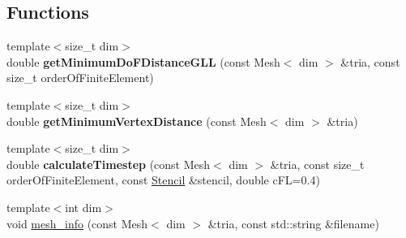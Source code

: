 \subsection*{Functions}
\begin{DoxyCompactItemize}
\item 
\hypertarget{namespacenatrium_1_1CFDSolverUtilities_a3389fcb9cec2ab96fc0623040ac03c58}{
{\footnotesize template$<$size\_\-t dim$>$ }\\double {\bfseries getMinimumDoFDistanceGLL} (const Mesh$<$ dim $>$ \&tria, const size\_\-t orderOfFiniteElement)}
\label{namespacenatrium_1_1CFDSolverUtilities_a3389fcb9cec2ab96fc0623040ac03c58}

\item 
\hypertarget{namespacenatrium_1_1CFDSolverUtilities_a8f085f7c799843b1e70330b35ef6747d}{
{\footnotesize template$<$size\_\-t dim$>$ }\\double {\bfseries getMinimumVertexDistance} (const Mesh$<$ dim $>$ \&tria)}
\label{namespacenatrium_1_1CFDSolverUtilities_a8f085f7c799843b1e70330b35ef6747d}

\item 
\hypertarget{namespacenatrium_1_1CFDSolverUtilities_a8b3dcb633547349d6e217692dccfbc58}{
{\footnotesize template$<$size\_\-t dim$>$ }\\double {\bfseries calculateTimestep} (const Mesh$<$ dim $>$ \&tria, const size\_\-t orderOfFiniteElement, const \hyperlink{classnatrium_1_1Stencil}{Stencil} \&stencil, double cFL=0.4)}
\label{namespacenatrium_1_1CFDSolverUtilities_a8b3dcb633547349d6e217692dccfbc58}

\item 
\hypertarget{namespacenatrium_1_1CFDSolverUtilities_adbcdda8cf5f7f3f0c835950a23e4c888}{
{\footnotesize template$<$int dim$>$ }\\void \hyperlink{namespacenatrium_1_1CFDSolverUtilities_adbcdda8cf5f7f3f0c835950a23e4c888}{mesh\_\-info} (const Mesh$<$ dim $>$ \&tria, const std::string \&filename)}
\label{namespacenatrium_1_1CFDSolverUtilities_adbcdda8cf5f7f3f0c835950a23e4c888}


\end{DoxyCompactItemize}
